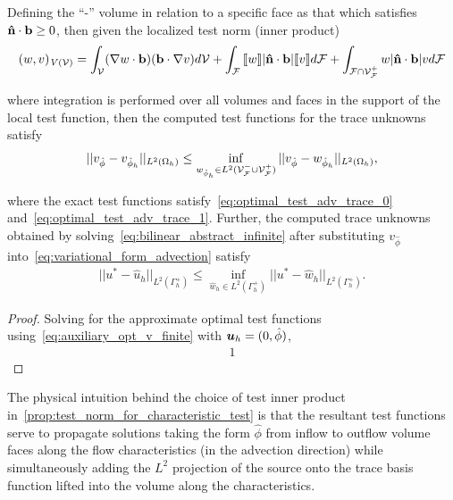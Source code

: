\begin{proposition} \label{prop:test_norm_for_characteristic_test}
Defining the ``-'' volume in relation to a specific face as that which satisfies $\mathbf{{\hat{n}}} \cdot \mathbf{{b}} \ge 0$,
then given the localized test norm (inner product)
\begin{align}
(w,v)_{\fspace{V}(\fe{V})}
= 
\int_{\fe{V}} (\nabla w \cdot \vect{b})(\vect{b} \cdot \nabla v) d\fe{V}
+
\int_{\fe{F}} \jump{w} |\vect{\hat{n}} \cdot \vect{b}| \jump{v} d\fe{F}
+
\int_{\fe{F} \cap \fe{V}_{\fe{F}}^+} w |\vect{\hat{n}} \cdot \vect{b}| v d\fe{F}
\end{align}

where integration is performed over all volumes and faces in the support of the local test function, then the computed test functions for the trace unknowns satisfy
\begin{align}
||v_{\hat{\phi}}-v_{\hat{\phi}_h}||_{{L^2(\Omega_h)}}
\le
\inf_{w_{\hat{\phi}_h} \in L^2(\mathcal{{{V}}}_{\mathcal{{{F}}}}^- \cup \mathcal{{{V}}}_{\mathcal{{{F}}}}^+)}
||v_{\hat{\phi}}-w_{\hat{\phi}_h}||_{{L^2(\Omega_h)}},
\end{align}

where the exact test functions satisfy~\eqref{eq:optimal_test_adv_trace_0} and~\eqref{eq:optimal_test_adv_trace_1}.
Further, the computed trace unknowns obtained by solving~\eqref{eq:bilinear_abstract_infinite} after substituting
$v_{\hat{\phi}}$ into~\eqref{eq:variational_form_advection} satisfy
\begin{align}
||u^*-\hat{u}_h||_{{L^2(\Gamma^+_h)}}
\le
\inf_{\hat{w}_h \in {L^2(\Gamma^+_h)}}
||u^*-\hat{w}_h||_{{L^2(\Gamma^+_h)}}.
\end{align}

\end{proposition}

\begin{proof}
Solving for the approximate optimal test functions using~\eqref{eq:auxiliary_opt_v_finite} with $\mathit{\bm{{u}}}_h =
(0,\hat{\phi})$,
\begin{align}
1
\end{align}

\end{proof}

\begin{remark}
The physical intuition behind the choice of test inner product in~\autoref{prop:test_norm_for_characteristic_test} is
that the resultant test functions serve to propagate solutions taking the form $\hat{\phi}$ from inflow to outflow
volume faces along the flow characteristics (in the advection direction) while simultaneously adding the $L^2$
projection of the source onto the trace basis function lifted into the volume along the characteristics. 
\end{remark}


